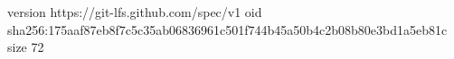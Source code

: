 version https://git-lfs.github.com/spec/v1
oid sha256:175aaf87eb8f7c5c35ab06836961c501f744b45a50b4c2b08b80e3bd1a5eb81c
size 72
